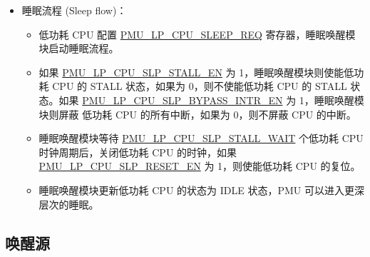 \documentclass[main\_\_CN.tex]{subfiles}
\begin{document}
\begin{itemize}
    \item 睡眠流程 (Sleep flow)：
    \begin{itemize}
    \item 低功耗 CPU 配置 \hyperref[fielddesc:PMULPCPUSLEEPREQ]{PMU\_LP\_CPU\_SLEEP\_REQ} 寄存器，睡眠唤醒模块启动睡眠流程。
    \item 如果 \hyperref[fielddesc:PMULPCPUSLPSTALLEN]{PMU\_LP\_CPU\_SLP\_STALL\_EN} 为 1，睡眠唤醒模块则使能低功耗 CPU 的 STALL 状态，如果为 0，则不使能低功耗 CPU 的 STALL 状态。如果 \hyperref[fielddesc:PMULPCPUSLPBYPASSINTREN]{PMU\_LP\_CPU\_SLP\_BYPASS\_INTR\_EN} 为 1，睡眠唤醒模块则屏蔽 低功耗 CPU 的所有中断，如果为 0，则不屏蔽 CPU 的中断。
    \item 睡眠唤醒模块等待 \hyperref[fielddesc:PMULPCPUSLPSTALLWAIT]{PMU\_LP\_CPU\_SLP\_STALL\_WAIT} 个低功耗 CPU 时钟周期后，关闭低功耗 CPU 的时钟，如果 \hyperref[fielddesc:PMULPCPUSLPRESETEN]{PMU\_LP\_CPU\_SLP\_RESET\_EN} 为 1，则使能低功耗 CPU 的复位。
    \item 睡眠唤醒模块更新低功耗 CPU 的状态为 IDLE 状态，PMU 可以进入更深层次的睡眠。
   \end{itemize}
   \end{itemize}

\subsection{唤醒源}
\end{document}
